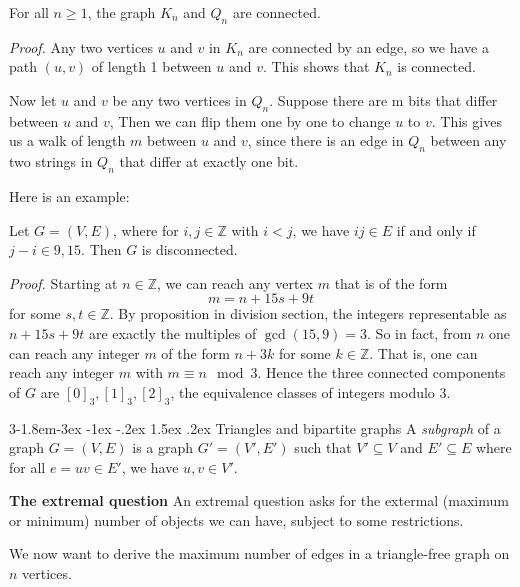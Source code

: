 \documentclass{tufte-handout}
\makeatletter
\renewcommand{\subsection}{\@startsection{subsection}%
    {3}{-1.8em}{-3ex \@plus -1ex \@minus -.2ex}%
    {1.5ex \@plus .2ex}
    {\hspace*{-5.5em}\fcolorbox{ltblue}{ltblue}{\parbox[c][1.0ex][b]{4em}{\phantom{space}}}
    \normalfont\large\itshape\color{ltblue}}}
\makeatother
\begin{document}
\begin{Proposition}
    For all \( n \geq 1 \), the graph \( K_n \) and \( Q_n \) are connected.
\end{Proposition}

\textit{Proof.} Any two vertices \( u \) and \( v \) in \( K_n \) are connected by an edge, so
we have a path \( (u,v) \) of length 1 between \( u \) and \( v \). This shows that \( K_n \)
is connected.

Now let \( u \) and \( v \) be any two vertices in \( Q_n \). Suppose there are m 
bits that differ between \( u \) and \( v \), Then we can flip them one by one to change \( u \) to \( v \).
This gives us a walk of length \( m \) between \( u \) and \( v \), since there is an
edge in \( Q_n \) between any two strings in \( Q_n \) that differ at exactly one bit. \qedsymbol

Here is an example:
\begin{Example}
    Let \( G = (V,E) \), where for \( i,j \in \mathbb{Z} \) with \( i<j \), we have \( ij \in E \)
    if and only if \( j-i \in {9,15} \). Then \( G \) is disconnected.
\end{Example}
\textit{Proof.}
Starting at \( n \in \mathbb{Z} \), we can reach any vertex \( m \) that is of the form \[m=n+15s+9t\]
for some \( s,t \in \mathbb{Z} \). By proposition in division section, the integers representable as
\( n+15s+9t \) are exactly the multiples of \( \gcd(15,9) = 3 \). So in fact, from \( n \) one can reach any integer \( m \)
of the form \( n+3k \) for some \( k \in \mathbb{Z} \). That is, one can reach any integer \( m \) with
\( m \equiv n \mod 3 \). Hence the three connected components of \( G \) are \( [0]_3, [1]_3,[2]_3\),
the equivalence classes of integers modulo 3. \qedsymbol

\subsection{Triangles and bipartite graphs}
A \textit{subgraph} of a graph \( G = (V,E) \) is a graph \( G' = (V',E') \) such that \( V' \subseteq V \) and \( E' \subseteq E \)
where for all \( e=uv \in E' \), we have \( u,v \in V' \).

\textbf{The extremal question} An extremal question asks for the extermal (maximum or minimum) number of objects
we can have, subject to some restrictions.

We now want to derive the maximum number of edges in a triangle-free graph on \( n \) vertices.
\end{document}

